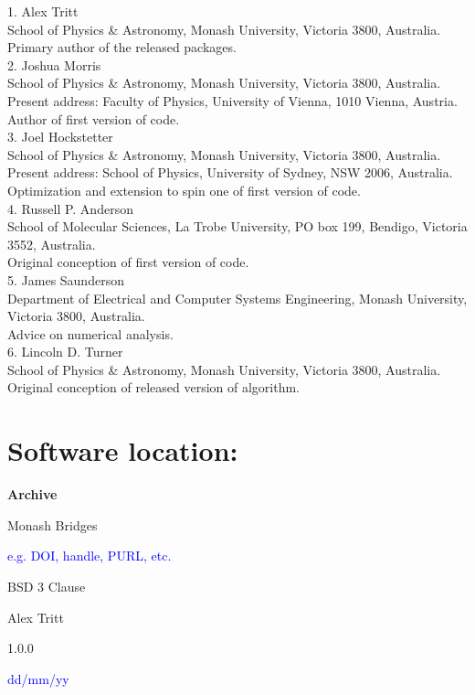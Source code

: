 \documentclass{jors}
\begin{document}
1. Alex Tritt\\
	School of Physics \& Astronomy, Monash University, Victoria 3800, Australia.\\
	Primary author of the released packages.\\
2. Joshua Morris\\
	School of Physics \& Astronomy, Monash University, Victoria 3800, Australia.\\
	Present address: Faculty of Physics, University of Vienna, 1010 Vienna, Austria.\\
	Author of first version of code.\\
3. Joel Hockstetter\\
	School of Physics \& Astronomy, Monash University, Victoria 3800, Australia.\\
	Present address: School of Physics, University of Sydney, NSW 2006, Australia.\\
	Optimization and extension to spin one of first version of code.\\
4. Russell P. Anderson\\
	School of Molecular Sciences, La Trobe University, PO box 199, Bendigo, Victoria 3552, Australia.\\
	Original conception of first version of code.\\
5. James Saunderson\\
	Department of Electrical and Computer Systems Engineering, Monash University, Victoria 3800, Australia.\\
	Advice on numerical analysis.\\
6. Lincoln D. Turner\\
	School of Physics \& Astronomy, Monash University, Victoria 3800, Australia.\\
	Original conception of released version of algorithm.

\section*{Software location:}

{\bf Archive}

\begin{description}[noitemsep,topsep=0pt]
	\item[Name:] Monash Bridges
	\item[Persistent identifier:] \textcolor{blue}{e.g. DOI, handle, PURL, etc.}
	\item[Licence:] BSD 3 Clause
	\item[Publisher:]  Alex Tritt
	\item[Version published:] 1.0.0
	\item[Date published:] \textcolor{blue}{dd/mm/yy}
\end{description}
\end{document}
